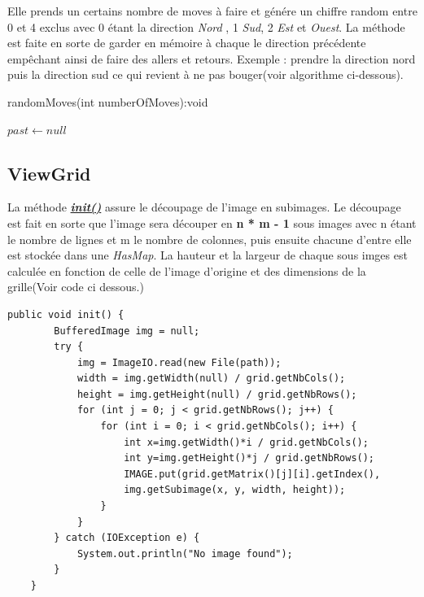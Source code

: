 \documentclass[12pt]{article}
\begin{document}
Elle prends un certains nombre de moves à faire et génére un chiffre random entre 0 et 4 exclus avec 0 étant la direction \textit{Nord }, 1 \textit{Sud}, 2 \textit{Est} et \textit{Ouest}. La méthode est faite en sorte de garder en mémoire à chaque le direction précédente empêchant ainsi de faire des allers et retours. Exemple : prendre la direction nord puis la direction sud ce qui revient à ne pas bouger(voir algorithme ci-dessous).
\newpage
	\begin{algorithm}[H]
		\caption{randomMoves(int numberOfMoves):void}
		$past\leftarrow null$
		
	\end{algorithm}
\newpage	
\subsection{ViewGrid}
La méthode \textbf{\textit{\underline{init()}}} assure le découpage de l'image en subimages.
Le découpage est fait en sorte que l'image sera découper en \textbf{n * m - 1} sous images avec n étant le nombre de lignes et m le nombre de colonnes, puis ensuite chacune d'entre elle est stockée dans une \textit{HasMap}. La hauteur et la largeur de chaque sous imges est calculée en fonction de celle de l'image d'origine et des dimensions de la grille(Voir code ci dessous.) 
\begin{lstlisting}[tabsize=2,gobble=1]
	public void init() {
		BufferedImage img = null;
		try {
			img = ImageIO.read(new File(path));
			width = img.getWidth(null) / grid.getNbCols();
			height = img.getHeight(null) / grid.getNbRows();
			for (int j = 0; j < grid.getNbRows(); j++) {
				for (int i = 0; i < grid.getNbCols(); i++) {
					int x=img.getWidth()*i / grid.getNbCols();
					int y=img.getHeight()*j / grid.getNbRows();
					IMAGE.put(grid.getMatrix()[j][i].getIndex(), 
					img.getSubimage(x, y, width, height));
				}
			}
		} catch (IOException e) {
			System.out.println("No image found");
		}
	}
\end{lstlisting}
\newpage
\end{document}
